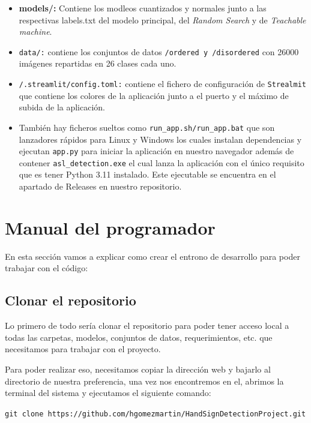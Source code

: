 \begin{itemize}
    \item \textbf{models/:} Contiene los modleos cuantizados y normales junto a las respectivas labels.txt del modelo principal, del \textit{Random Search} y de \textit{Teachable machine}.

    \item \texttt{data/:} contiene los conjuntos de datos \texttt{/ordered y /disordered} con 26000 imágenes repartidas en 26 clases cada uno.

    \item \texttt{/.streamlit/config.toml:} contiene el fichero de configuración de \texttt{Strealmit} que contiene los colores de la aplicación junto a el puerto y el máximo de subida de la aplicación.

    \item También hay ficheros sueltos como \texttt{run\_app.sh/run\_app.bat} que son lanzadores rápidos para Linux y Windows los cuales instalan dependencias y ejecutan \texttt{app.py} para iniciar la aplicación en nuestro navegador además de contener \texttt{asl\_detection.exe} el cual lanza la aplicación con el único requisito que es tener Python 3.11 instalado. Este ejecutable se encuentra en el apartado de Releases en nuestro repositorio.

\end{itemize}



\section{Manual del programador}
En esta sección vamos a explicar como crear el entrono de desarrollo para poder trabajar con el código:

\subsection{Clonar el repositorio}
Lo primero de todo sería clonar el repositorio para poder tener acceso local a todas las carpetas, modelos, conjuntos de datos, requerimientos, etc. que necesitamos para trabajar con el proyecto.

Para poder realizar eso, necesitamos copiar la dirección web y bajarlo al directorio de nuestra preferencia, una vez nos encontremos en el, abrimos la terminal del sistema y ejecutamos el siguiente comando:

\texttt{git clone https://github.com/hgomezmartin/HandSignDetectionProject.git}


